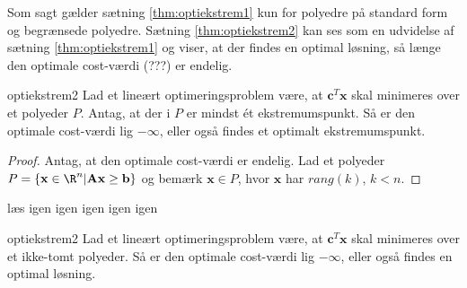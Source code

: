 %
%
%
Som sagt gælder sætning \ref{thm:optiekstrem1} kun for polyedre på standard form og begrænsede polyedre. 
Sætning \ref{thm:optiekstrem2} kan ses som en udvidelse af sætning \ref{thm:optiekstrem1} og viser, at der findes en optimal løsning, så længe den optimale cost-værdi (???) er endelig. 
\begin{thm}{}{optiekstrem2}
Lad et lineært optimeringsproblem være, at $\textbf{c}^T \textbf{x}$ skal minimeres over et polyeder $P$. 
Antag, at der i $P$ er mindst ét ekstremumspunkt. 
Så er den optimale cost-værdi lig $- \infty$, eller også findes et optimalt ekstremumspunkt. 
\end{thm}
%
\begin{proof}
Antag, at den optimale cost-værdi er endelig. 
Lad et polyeder $P = \{\textbf{x} \in \R^n | \textbf{A}\textbf{x} \geq \textbf{b} \}$ og bemærk $\textbf{x} \in P$, hvor $\textbf{x}$ har $rang(k)$, $k < n$. 
\end{proof}
%
læs igen igen igen igen igen
\begin{kor}{}{optiekstrem2}
Lad et lineært optimeringsproblem være, at $\textbf{c}^T \textbf{x}$ skal minimeres over et ikke-tomt polyeder.
Så er den optimale cost-værdi lig $- \infty$, eller også findes en optimal løsning. 
\end{kor}
%
%